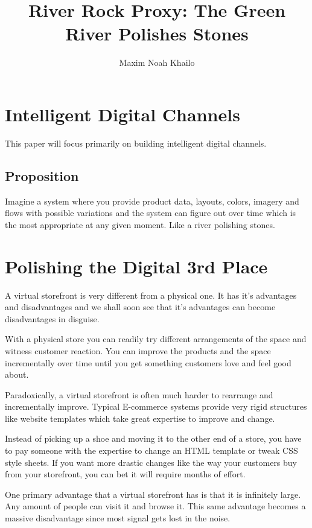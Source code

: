 \documentclass[11pt]{article}
\title{River Rock Proxy: The Green River Polishes Stones}
\author{Maxim Noah Khailo}
\begin{document}
\maketitle
\section{Intelligent Digital Channels}

This paper will focus primarily on building intelligent digital channels.

\subsection{Proposition}

Imagine a system where you provide product data, layouts, colors, imagery and flows 
with possible variations and the system can figure out over time which is the most appropriate
at any given moment. Like a river polishing stones.

\section{Polishing the Digital 3rd Place}

A virtual storefront is very different from a physical one. It has it's 
advantages and disadvantages and we shall soon see that it's advantages can 
become disadvantages in disguise. 

With a physical store you can readily try different arrangements of the space and
witness customer reaction. You can improve the products and the space
incrementally over time until you get something customers love and feel good about.

Paradoxically, a virtual storefront is often much harder to rearrange and incrementally
improve. Typical E-commerce systems provide very rigid structures like website
templates which take great expertise to improve and change. 

Instead of picking up a shoe and moving it to the other end of a store, you have 
to pay someone with the expertise to change an HTML template or tweak CSS style sheets.
If you want more drastic changes like the way your customers buy from your storefront,
you can bet it will require months of effort.

One primary advantage that a virtual storefront has is that it is infinitely large. Any
amount of people can visit it and browse it. This same advantage becomes a massive
disadvantage since most signal gets lost in the noise.
\end{document}
